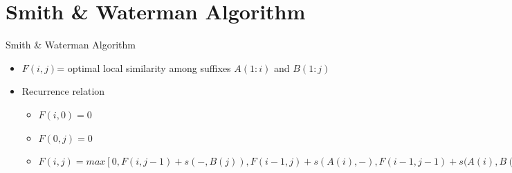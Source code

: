 \documentclass{bredelebeamer}
\begin{document}
 \section{Smith \& Waterman Algorithm}
  \begin{frame}{}
    \tableofcontents[currentsection]
\end{frame}
 \begin{frame}{Smith \& Waterman Algorithm}
    \begin{itemize}
        \item $F(i,j)$= optimal local similarity among suffixes $ A(1:i)$ and $B(1:j)$
        \item Recurrence relation
        \begin{itemize}
            \item $F(i,0) = 0$
            \item $F(0,j) = 0$
            \item $F(i, j) =  max [0, F(i,j-1) + s(-,B(j)),
            F(i-1,j) + s(A(i),-),
            F(i-1,j-1) + s(A(i),B(j)]$
            
        \end{itemize}
    \end{itemize} 
 \end{frame}
\end{document}
